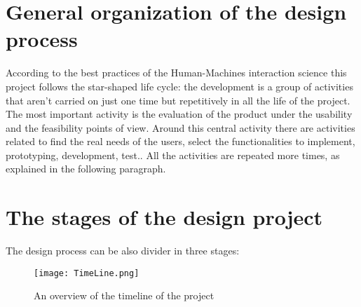 \section{ General organization of the design process }
According to the best practices of the Human-Machines interaction science this project follows the star-shaped life cycle: the development is a group of activities that aren't carried on just one time but repetitively in all the life of the project. The most important activity is the evaluation of the product under the usability and the feasibility points of view. Around this central activity there are activities related to find the real needs of the users, select the functionalities to implement, prototyping, development, test.. All the activities are repeated more times, as explained in the following paragraph.    

\section{The stages of the design project}

The design process can be also divider in three stages:

\begin{figure}[H]
\centering
\texttt{[image: TimeLine.png]} 
\caption{An overview of the timeline of the project}
\end{figure}


